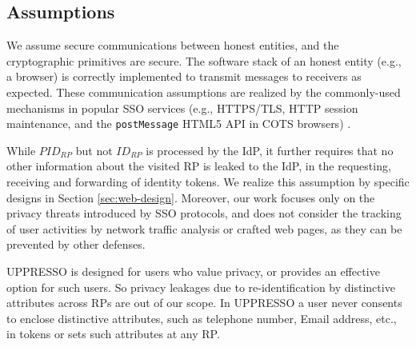 \subsection{Assumptions}
We assume secure communications between honest entities, and the cryptographic primitives are secure. The software stack of an honest entity (e.g., a browser) is correctly implemented to transmit messages to receivers as expected.
These communication assumptions are realized by the commonly-used mechanisms in popular SSO services
 (e.g., HTTPS/TLS, HTTP session maintenance, and the \verb+postMessage+ HTML5 API in COTS browsers) \cite{OpenIDConnect, rfc6749, SAML,GoogleIdIntegrate,de2014oauth,FettKS14,BrowserID,uber}.

While $PID_{RP}$ but not $ID_{RP}$ is processed by the IdP,
it further requires that no other information about the visited RP is leaked to the IdP,
 in the requesting, receiving and forwarding of identity tokens.
We realize this assumption by specific designs in Section \ref{sec:web-design}.
Moreover, our work focuses only on the privacy threats introduced by SSO protocols, and does not consider the tracking of user activities by network traffic analysis or crafted web pages, as they can be prevented by other defenses.


UPPRESSO is designed for users who value privacy,
        or provides an effective option for such users.
So privacy leakages due to re-identification by distinctive attributes across RPs are out of our scope.
In UPPRESSO a user never consents to enclose distinctive attributes, such as telephone number, Email address, etc., in tokens or sets such attributes at any RP.
